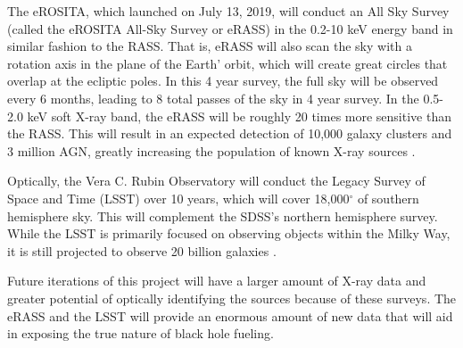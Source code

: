 The eROSITA, which launched on July 13, 2019, will conduct an All Sky Survey (called the eROSITA All-Sky Survey or eRASS) in the 0.2-10 keV energy band in similar fashion to the RASS.
That is, eRASS will also scan the sky with a rotation axis in the plane of the Earth' orbit, which will create great circles that overlap at the ecliptic poles. 
In this 4 year survey, the full sky will be observed every 6 months, leading to 8 total passes of the sky in 4 year survey. 
In the 0.5-2.0 keV soft X-ray band, the eRASS will be roughly 20 times more sensitive than the RASS. 
This will result in an expected detection of 10,000 galaxy clusters and 3 million AGN, greatly increasing the population of known X-ray sources \citep{merloni2012}.

Optically, the Vera C. Rubin Observatory will conduct the Legacy Survey of Space and Time (LSST) over 10 years, which will cover 18,000$^{\circ}$ of southern hemisphere sky.
This will complement the SDSS's northern hemisphere survey. 
While the LSST is primarily focused on observing objects within the Milky Way, it is still projected to observe 20 billion galaxies \citep{ivezi2019}.

Future iterations of this project will have a larger amount of X-ray data and greater potential of optically identifying the sources because of these surveys. 
The eRASS and the LSST will provide an enormous amount of new data that will aid in exposing the true nature of black hole fueling. 
